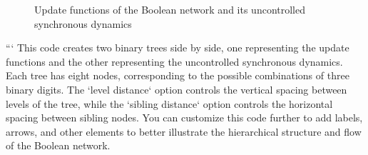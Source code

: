 \documentclass{article}
\begin{document}
\begin{figure}[h]
    \centering
    \caption{Update functions of the Boolean network and its uncontrolled synchronous dynamics}
    \label{fig:boolean-network-update-functions}
\end{figure}
```
This code creates two binary trees side by side, one representing the update functions and the other representing the uncontrolled synchronous dynamics. Each tree has eight nodes, corresponding to the possible combinations of three binary digits. The `level distance` option controls the vertical spacing between levels of the tree, while the `sibling distance` option controls the horizontal spacing between sibling nodes.
You can customize this code further to add labels, arrows, and other elements to better illustrate the hierarchical structure and flow of the Boolean network.
\end{document}
